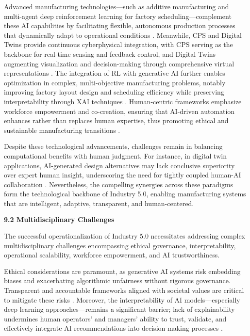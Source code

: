 \documentclass[11pt]{article}
\begin{document}
Advanced manufacturing technologies—such as additive manufacturing and multi-agent deep reinforcement learning for factory scheduling—complement these AI capabilities by facilitating flexible, autonomous production processes that dynamically adapt to operational conditions \cite{ref16}. Meanwhile, CPS and Digital Twins provide continuous cyberphysical integration, with CPS serving as the backbone for real-time sensing and feedback control, and Digital Twins augmenting visualization and decision-making through comprehensive virtual representations \cite{ref23}. The integration of RL with generative AI further enables optimization in complex, multi-objective manufacturing problems, notably improving factory layout design and scheduling efficiency while preserving interpretability through XAI techniques \cite{ref12}. Human-centric frameworks emphasize workforce empowerment and co-creation, ensuring that AI-driven automation enhances rather than replaces human expertise, thus promoting ethical and sustainable manufacturing transitions \cite{ref2}.

Despite these technological advancements, challenges remain in balancing computational benefits with human judgment. For instance, in digital twin applications, AI-generated design alternatives may lack conclusive superiority over expert human insight, underscoring the need for tightly coupled human-AI collaboration \cite{ref2}. Nevertheless, the compelling synergies across these paradigms form the technological backbone of Industry 5.0, enabling manufacturing systems that are intelligent, adaptive, transparent, and human-centered.

\textbf{9.2 Multidisciplinary Challenges}

The successful operationalization of Industry 5.0 necessitates addressing complex multidisciplinary challenges encompassing ethical governance, interpretability, operational scalability, workforce empowerment, and AI trustworthiness.

Ethical considerations are paramount, as generative AI systems risk embedding biases and exacerbating algorithmic unfairness without rigorous governance. Transparent and accountable frameworks aligned with societal values are critical to mitigate these risks \cite{ref2,ref41}. Moreover, the interpretability of AI models—especially deep learning approaches—remains a significant barrier; lack of explainability undermines human operators’ and managers’ ability to trust, validate, and effectively integrate AI recommendations into decision-making processes \cite{ref30}.
\end{document}
